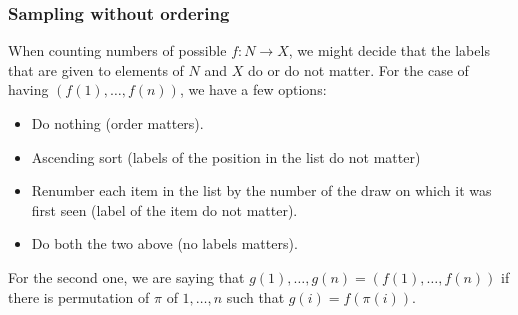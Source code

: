 \subsubsection{Sampling without ordering}
When counting numbers of possible $f:N\to X$, we might decide that the labels that are given to elements of $N$ and $X$ do or do not matter. For the case of having $(f(1),\dots,f(n))$, we have a few options: 
\begin{itemize}[noitemsep,topsep=0pt]
    \item Do nothing (order matters). 
    \item Ascending sort (labels of the position in the list do not matter)
    \item Renumber each item in the list by the number of the draw on which it was first seen (label of the item do not matter).
    \item Do both the two above (no labels matters). 
\end{itemize}
For the second one, we are saying that $g(1),\dots,g(n)=(f(1),\dots,f(n))$ if there is permutation of $\pi$ of $1,\dots,n$ such that $g(i)=f(\pi(i))$. 
